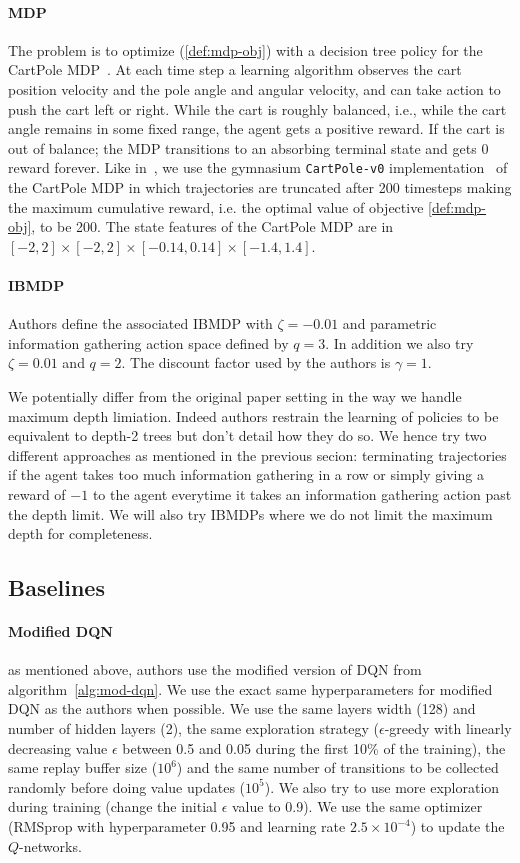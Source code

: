 \paragraph{MDP} The problem is to optimize (\ref{def:mdp-obj}) with a decision tree policy for the CartPole MDP~\cite{cartpole}.
At each time step a learning algorithm observes the cart position velocity and the pole angle and angular velocity, and can take action to push the cart left or right.
While the cart is roughly balanced, i.e., while the cart angle remains in some fixed range, the agent gets a positive reward.
If the cart is out of balance; the MDP transitions to an absorbing terminal state and gets 0 reward forever.
Like in~\cite{topin2021iterative}, we use the gymnasium \texttt{CartPole-v0} implementation~\cite{gymnasium} of the CartPole MDP in which trajectories are truncated after 200 timesteps making the maximum cumulative reward, i.e. the optimal value of objective \ref{def:mdp-obj}, to be 200.
The state features of the CartPole MDP are in $[-2, 2] \times [-2, 2] \times [-0.14, 0.14] \times [-1.4, 1.4]$.

\paragraph{IBMDP} Authors define the associated IBMDP with $\zeta=-0.01$ and parametric information gathering action space defined by $q=3$.
In addition we also try $\zeta=0.01$ and $q=2$.
The discount factor used by the authors is $\gamma=1$.

We potentially differ from the original paper setting in the way we handle maximum depth limiation. 
Indeed authors restrain the learning of policies to be equivalent to depth-2 trees but don't detail how they do so.
We hence try two different approaches as mentioned in the previous secion: terminating trajectories if the agent takes too much information gathering in a row or simply giving a reward of $-1$ to the agent everytime it takes an information gathering action past the depth limit.
We will also try IBMDPs where we do not limit the maximum depth for completeness.

\subsection{Baselines}
\paragraph{Modified DQN} as mentioned above, authors use the modified version of DQN from algorithm~\ref{alg:mod-dqn}.
We use the exact same hyperparameters for modified DQN as the authors when possible. 
We use the same layers width (128) and number of hidden layers (2), the same exploration strategy ($\epsilon$-greedy with linearly decreasing value $\epsilon$ between 0.5 and 0.05 during the first 10\% of the training),
the same replay buffer size ($10^6$) and the same number of transitions to be collected randomly before doing value updates ($10^5$).
We also try to use more exploration during training (change the initial $\epsilon$ value to 0.9).
We use the same optimizer (RMSprop with hyperparameter 0.95 and learning rate $2.5 \times 10^{-4}$) to update the $Q$-networks.

